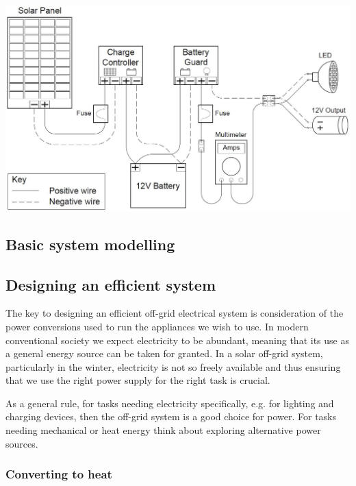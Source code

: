 \documentclass{article}
\theoremstyle{definition}
\theoremstyle{definition}
\theoremstyle{remark}
\begin{document}
  \begin{center}
    \includegraphics[width=0.75\paperwidth]{Images/image_11_2_(12v_system).png}
  \end{center}

  {\color{blue}\subsection{Basic system modelling}} %
  \label{sec:basic_system_modelling}
  

  {\color{blue}\subsection{Designing an efficient system}} %
  \label{sub:designing_an_efficient_system}

    The key to designing an efficient off-grid electrical system is consideration of the power conversions used to run the appliances we wish to use. In modern conventional society we expect electricity to be abundant, meaning that its use as a general energy source can be taken for granted. In a solar off-grid system, particularly in the winter, electricity is not so freely available and thus ensuring that we use the right power supply for the right task is crucial. 

    As a general rule, for tasks needing electricity specifically, e.g. for lighting and charging devices, then the off-grid system is a good choice for power. For tasks needing mechanical or heat energy think about exploring alternative power sources.

    \subsubsection{Converting to heat} %
    \label{ssub:converting_to_heat}
\end{document}
